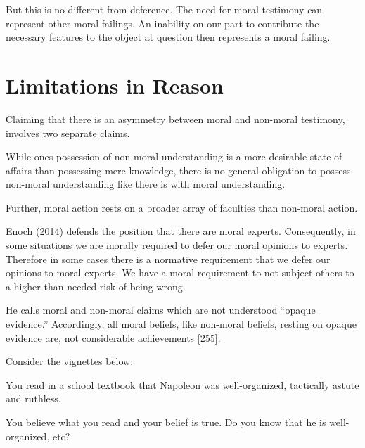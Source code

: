 \documentclass[12pt]{book}
\theoremstyle{definition}
\theoremstyle{remark}
\newcommand{\NormalTok}[1]{#1}
\newenvironment{Shaded}{}{}
\newenvironment{Highlighting}{}{}
\begin{document}
But this is no different from deference. The need for moral testimony can represent other moral failings. An inability on our part to contribute the necessary features to the object at question then represents a moral failing.

\section{Limitations in Reason}\label{limitations-in-reason}

Claiming that there is an asymmetry between moral and non-moral testimony, involves two separate claims.

\begin{Shaded}
\begin{Highlighting}[]

\NormalTok{While one\textquotesingle{}s possession of non{-}moral understanding is a more desirable state of affairs than possessing mere knowledge, there is no general obligation to possess non{-}moral understanding like there is with moral understanding.}
\end{Highlighting}
\end{Shaded}

Further, moral action rests on a broader array of faculties than non-moral action.

Enoch (2014) defends the position that there are moral experts. Consequently, in some situations we are morally required to defer our moral opinions to experts. Therefore in some cases there is a normative requirement that we defer our opinions to moral experts. We have a moral requirement to not subject others to a higher-than-needed risk of being wrong.

He calls moral and non-moral claims which are not understood ``opaque evidence.'' Accordingly, all moral beliefs, like non-moral beliefs, resting on opaque evidence are, not considerable achievements {[}255{]}.

Consider the vignettes below:

\begin{Shaded}
\begin{Highlighting}[]

\NormalTok{You read in a school textbook that Napoleon was well{-}organized, tactically astute and ruthless.}
\end{Highlighting}
\end{Shaded}

You believe what you read and your belief is true. Do you know that he is well-organized, etc?
\end{document}
